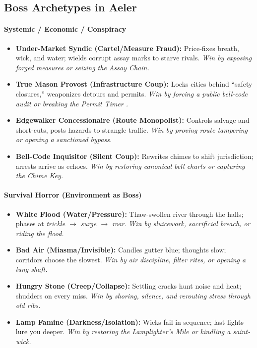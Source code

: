 \subsection*{Boss Archetypes in Aeler}
\label{sec:aeler-bosses}

\paragraph{Systemic / Economic / Conspiracy}
\begin{itemize}
  \item \textbf{Under-Market Syndic (Cartel/Measure Fraud):} Price-fixes breath, wick, and water; wields corrupt assay marks to starve rivals. \emph{Win by exposing forged measures or seizing the Assay Chain.}
  \item \textbf{True Mason Provost (Infrastructure Coup):} Locks cities behind ``safety closures,'' weaponizes detours and permits. \emph{Win by forcing a public bell-code audit or breaking the Permit Timer .}
  \item \textbf{Edgewalker Concessionaire (Route Monopolist):} Controls salvage and short-cuts, posts hazards to strangle traffic. \emph{Win by proving route tampering or opening a sanctioned bypass.}
  \item \textbf{Bell-Code Inquisitor (Silent Coup):} Rewrites chimes to shift jurisdiction; arrests arrive as echoes. \emph{Win by restoring canonical bell charts or capturing the Chime Key.}
\end{itemize}

\paragraph{Survival Horror (Environment as Boss)}
\begin{itemize}
  \item \textbf{White Flood (Water/Pressure):} Thaw-swollen river through the halls; phases at \emph{trickle $\rightarrow$ surge $\rightarrow$ roar}. \emph{Win by sluicework, sacrificial breach, or riding the flood.}
  \item \textbf{Bad Air (Miasma/Invisible):} Candles gutter blue; thoughts slow; corridors choose the slowest. \emph{Win by air discipline, filter rites, or opening a lung-shaft.}
  \item \textbf{Hungry Stone (Creep/Collapse):} Settling cracks hunt noise and heat; shudders on every miss. \emph{Win by shoring, silence, and rerouting stress through old ribs.}
  \item \textbf{Lamp Famine (Darkness/Isolation):} Wicks fail in sequence; last lights lure you deeper. \emph{Win by restoring the Lamplighter's Mile or kindling a saint-wick.}
\end{itemize}

